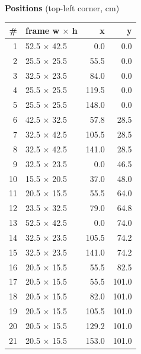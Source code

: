 \documentclass[a4paper,landscape,10pt]{article}
\begin{document}
\begin{minipage}[t]{0.25\textwidth}
\vspace{8pt}
{\bfseries Positions} (top-left corner, cm)\\[2pt]
\tiny
\begin{tabular}{@{}r l r r@{}}
\toprule
\# & frame w $\times$ h & x & y \\
\midrule
1 & 52.5 $\times$ 42.5 & 0.0 & 0.0 \\
2 & 25.5 $\times$ 25.5 & 55.5 & 0.0 \\
3 & 32.5 $\times$ 23.5 & 84.0 & 0.0 \\
4 & 25.5 $\times$ 25.5 & 119.5 & 0.0 \\
5 & 25.5 $\times$ 25.5 & 148.0 & 0.0 \\
6 & 42.5 $\times$ 32.5 & 57.8 & 28.5 \\
7 & 32.5 $\times$ 42.5 & 105.5 & 28.5 \\
8 & 32.5 $\times$ 42.5 & 141.0 & 28.5 \\
9 & 32.5 $\times$ 23.5 & 0.0 & 46.5 \\
10 & 15.5 $\times$ 20.5 & 37.0 & 48.0 \\
11 & 20.5 $\times$ 15.5 & 55.5 & 64.0 \\
12 & 23.5 $\times$ 32.5 & 79.0 & 64.8 \\
13 & 52.5 $\times$ 42.5 & 0.0 & 74.0 \\
14 & 32.5 $\times$ 23.5 & 105.5 & 74.2 \\
15 & 32.5 $\times$ 23.5 & 141.0 & 74.2 \\
16 & 20.5 $\times$ 15.5 & 55.5 & 82.5 \\
17 & 20.5 $\times$ 15.5 & 55.5 & 101.0 \\
18 & 20.5 $\times$ 15.5 & 82.0 & 101.0 \\
19 & 20.5 $\times$ 15.5 & 105.5 & 101.0 \\
20 & 20.5 $\times$ 15.5 & 129.2 & 101.0 \\
21 & 20.5 $\times$ 15.5 & 153.0 & 101.0 \\
\bottomrule
\end{tabular}
\end{minipage}
\clearpage
\end{document}
